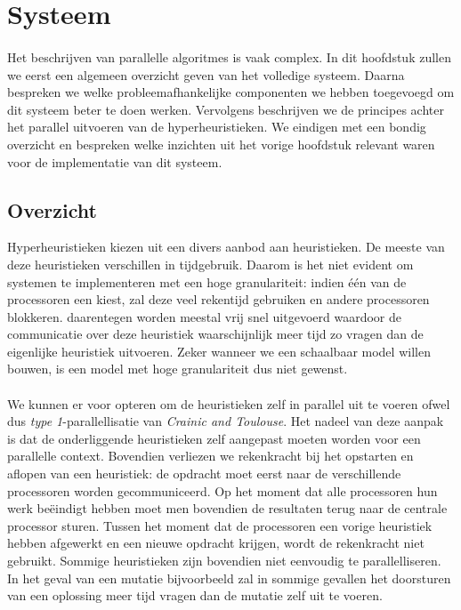 \section{Systeem}

\paragraph{}
Het beschrijven van parallelle algoritmes is vaak complex. In dit hoofdstuk zullen we eerst een algemeen overzicht geven van het volledige systeem. Daarna bespreken we welke probleemafhankelijke componenten we hebben toegevoegd om dit systeem beter te doen werken. Vervolgens beschrijven we de principes achter het parallel uitvoeren van de hyperheuristieken. We eindigen met een bondig overzicht en bespreken welke inzichten uit het vorige hoofdstuk relevant waren voor de implementatie van dit systeem.

\subsection{Overzicht}

Hyperheuristieken kiezen uit een divers aanbod aan heuristieken. De meeste van deze heuristieken verschillen in tijdgebruik. Daarom is het niet evident om systemen te implementeren met een hoge granulariteit: indien \'e\'en van de processoren een \abls{} \abh{} kiest, zal deze veel rekentijd gebruiken en andere processoren blokkeren. \abmt[M]{} \abhn{} daarentegen worden meestal vrij snel uitgevoerd waardoor de communicatie over deze heuristiek waarschijnlijk meer tijd zo vragen dan de eigenlijke heuristiek uitvoeren. Zeker wanneer we een schaalbaar model willen bouwen, is een model met hoge granulariteit dus niet gewenst.

\paragraph{}
We kunnen er voor opteren om de heuristieken zelf in parallel uit te voeren ofwel dus \emph{type 1}-parallellisatie van \emph{Crainic and Toulouse}\cite{crainicAndToulouse}. Het nadeel van deze aanpak is dat de onderliggende heuristieken zelf aangepast moeten worden voor een parallelle context. Bovendien verliezen we rekenkracht bij het opstarten en aflopen van een heuristiek: de opdracht moet eerst naar de verschillende processoren worden gecommuniceerd. Op het moment dat alle processoren hun werk be\"eindigt hebben moet men bovendien de resultaten terug naar de centrale processor sturen. Tussen het moment dat de processoren een vorige heuristiek hebben afgewerkt en een nieuwe opdracht krijgen, wordt de rekenkracht niet gebruikt. Sommige heuristieken zijn bovendien niet eenvoudig te parallelliseren. In het geval van een mutatie bijvoorbeeld zal in sommige gevallen het doorsturen van een oplossing meer tijd vragen dan de mutatie zelf uit te voeren.

